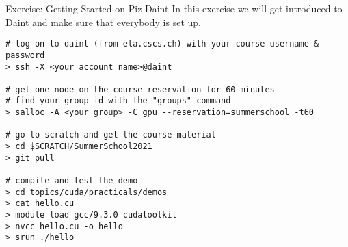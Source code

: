 \documentclass[aspectratio=43]{beamer}
\begin{document}
\begin{frame}[fragile]{Exercise: Getting Started on Piz Daint}
    In this exercise we will get introduced to Daint and make sure that everybody is set up.

    \begin{terminal}{}
        \begin{lstlisting}[style=terminal]
# log on to daint (from ela.cscs.ch) with your course username & password
> ssh -X <your account name>@daint

# get one node on the course reservation for 60 minutes
# find your group id with the "groups" command
> salloc -A <your group> -C gpu --reservation=summerschool -t60

# go to scratch and get the course material
> cd $SCRATCH/SummerSchool2021
> git pull

# compile and test the demo
> cd topics/cuda/practicals/demos
> cat hello.cu
> module load gcc/9.3.0 cudatoolkit
> nvcc hello.cu -o hello
> srun ./hello
        \end{lstlisting}
    \end{terminal}
\end{frame}
\end{document}
